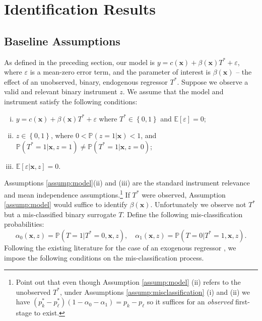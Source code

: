 \section{Identification Results}

\subsection{Baseline Assumptions}
As defined in the preceding section, our model is $y = c(\mathbf{x}) + \beta(\mathbf{x}) T^* + \varepsilon$, where $\varepsilon$ is a mean-zero error term, and the parameter of interest is $\beta(\mathbf{x})$ -- the effect of an unobserved, binary, endogenous regressor $T^*$.
Suppose we observe a valid and relevant binary instrument $z$.
We assume that the model and instrument satisfy the following conditions:
\begin{assump} \mbox{}
  \label{assump:model}
  \begin{enumerate}[(i)] 
    \item $y = c(\mathbf{x}) + \beta(\mathbf{x})T^* + \varepsilon$ where $T^* \in \left\{ 0,1 \right\}$ and $\mathbb{E}[\varepsilon]=0$;
    \item  $z \in \left\{ 0,1 \right\}$, where $0 < \mathbb{P}(z=1|\mathbf{x}) < 1$, and $\mathbb{P}(T^*=1|\mathbf{x},z=1) \neq \mathbb{P}(T^*=1|\mathbf{x},z=0)$;
    \item $\mathbb{E}[\varepsilon|\mathbf{x},z] = 0$.
  \end{enumerate}
\end{assump}

Assumptions \ref{assump:model}(ii) and (iii) are the standard instrument relevance and mean independence assumptions.\footnote{Point out that even though Assumption \ref{assump:model} (ii) refers to the unobserved $T^*$, under Assumptions \ref{assump:misclassification} (i) and (ii) we have $(p_k^* - p_\ell^*)(1 - \alpha_0 - \alpha_1) = p_k - p_\ell$ so it suffices for an \emph{observed} first-stage to exist.}
If $T^*$ were observed, Assumption \ref{assump:model} would suffice to identify  $\beta(\mathbf{x})$.  
Unfortunately we observe not $T^*$ but a mis-classified binary surrogate $T$.  
Define the following mis-classification probabilities:
\begin{equation}
\label{eq:adef}
  \alpha_0(\mathbf{x},z) = \mathbb{P}\left(T=1|T^*=0,\mathbf{x},z  \right), \quad
  \alpha_1(\mathbf{x},z) = \mathbb{P}\left(T=0|T^*=1,\mathbf{x},z  \right).
\end{equation}
Following the existing literature for the case of an exogenous regressor \citep{Mahajan,BBS,FL,KRS,Lewbel}, we impose the following conditions on the mis-classification process.

